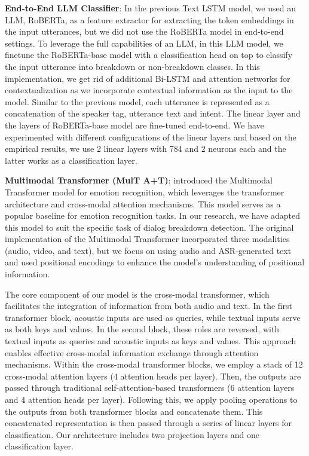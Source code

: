 \textbf{End-to-End LLM Classifier}: In the previous Text LSTM model, we used an LLM, RoBERTa, as a feature extractor for extracting the token embeddings in the input utterances, but we did not use the RoBERTa model in end-to-end settings. To leverage the full capabilities of an LLM, in this LLM model, we finetune the RoBERTa-base model with a classification head on top to classify the input utterance into breakdown or non-breakdown classes. In this implementation, we get rid of additional Bi-LSTM and attention networks for contextualization as we incorporate contextual information as the input to the model. Similar to the previous model, each utterance is represented as a concatenation of the speaker tag, utterance text and intent. The linear layer and the layers of RoBERTa-base model are fine-tuned end-to-end. We have experimented with different configurations of the linear layers and based on the empirical results, we use 2 linear layers with 784 and 2 neurons each and the latter works as a classification layer.  

\textbf{Multimodal Transformer (MulT A+T)}: 
\cite{tsai-etal-2019-multimodal} introduced the Multimodal Transformer model for emotion recognition, which leverages the transformer architecture and cross-modal attention mechanisms. This model serves as a popular baseline for emotion recognition tasks. In our research, we have adapted this model to suit the specific task of dialog breakdown detection. The original implementation of the Multimodal Transformer incorporated three modalities (audio, video, and text), but we focus on using audio and ASR-generated text and used positional encodings to enhance the model's understanding of positional information. 

The core component of our model is the cross-modal transformer, which facilitates the integration of information from both audio and text. In the first transformer block, acoustic inputs are used as queries, while textual inputs serve as both keys and values. In the second block, these roles are reversed, with textual inputs as queries and acoustic inputs as keys and values. This approach enables effective cross-modal information exchange through attention mechanisms. Within the cross-modal transformer blocks, we employ a stack of 12 cross-modal attention layers (4 attention heads per layer). Then, the outputs are passed through traditional self-attention-based transformers (6 attention layers and 4 attention heads per layer). Following this, we apply pooling operations to the outputs from both transformer blocks and concatenate them. This concatenated representation is then passed through a series of linear layers for classification. Our architecture includes two projection layers and one classification layer. 

